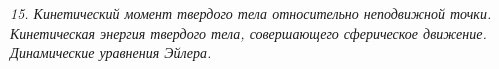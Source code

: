 \emph{15. Кинетический момент твердого тела относительно неподвижной точки.
Кинетическая энергия твердого тела, совершающего сферическое движение.
Динамические уравнения Эйлера.}

\newpage
